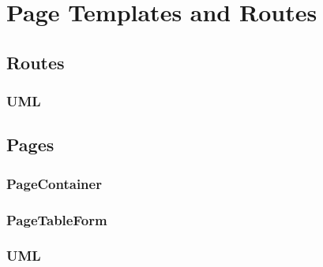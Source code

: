 \section{Page Templates and Routes}

	\subsection{Routes}
	
		\subsubsection{UML}
		
	\subsection{Pages}
	

	\subsubsection{PageContainer}
	
	\subsubsection{PageTableForm}
	
	\subsubsection{UML}
